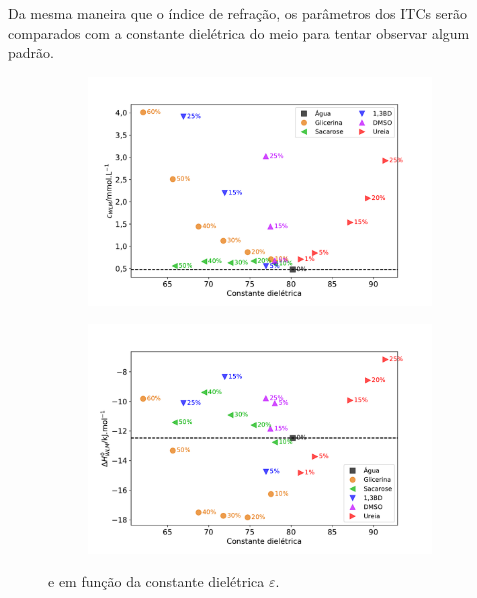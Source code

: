		Da mesma maneira que o índice de refração, os parâmetros dos ITCs serão comparados com a constante dielétrica do meio para tentar observar algum padrão.
		
		\begin{figure}[h]
			\begin{subfigure}[t]{0.5\textwidth}
				\centering
				\includegraphics[width=\textwidth]{imagens/itc/Cwlm_por_eps}
				\caption{\cwlm}
				\label{fig:cwlm_por_eps}
			\end{subfigure} %
			\begin{subfigure}[t]{0.5\textwidth}
				\centering
				\includegraphics[width=\textwidth]{imagens/itc/DHwlm_por_eps}
				\caption{\DHwlm}
				\label{fig:dhwlm_por_eps}
			\end{subfigure}
			
			\caption{\cwlm{} e \DHwlm{} em função da constante dielétrica \(\varepsilon\).}
			\label{fig:cwlm_dhwlm_por_eps}
		\end{figure}
		

